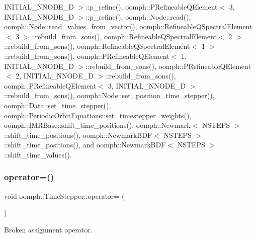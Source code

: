 I\+N\+I\+T\+I\+A\+L\+\_\+\+N\+N\+O\+D\+E\+\_\+D $>$\+::p\+\_\+refine(), oomph\+::\+P\+Refineable\+Q\+Element$<$ 3, I\+N\+I\+T\+I\+A\+L\+\_\+\+N\+N\+O\+D\+E\+\_\+D $>$\+::p\+\_\+refine(), oomph\+::\+Node\+::read(), oomph\+::\+Node\+::read\+\_\+values\+\_\+from\+\_\+vector(), oomph\+::\+Refineable\+Q\+Spectral\+Element$<$ 3 $>$\+::rebuild\+\_\+from\+\_\+sons(), oomph\+::\+Refineable\+Q\+Spectral\+Element$<$ 2 $>$\+::rebuild\+\_\+from\+\_\+sons(), oomph\+::\+Refineable\+Q\+Spectral\+Element$<$ 1 $>$\+::rebuild\+\_\+from\+\_\+sons(), oomph\+::\+P\+Refineable\+Q\+Element$<$ 1, I\+N\+I\+T\+I\+A\+L\+\_\+\+N\+N\+O\+D\+E\+\_\+D $>$\+::rebuild\+\_\+from\+\_\+sons(), oomph\+::\+P\+Refineable\+Q\+Element$<$ 2, I\+N\+I\+T\+I\+A\+L\+\_\+\+N\+N\+O\+D\+E\+\_\+D $>$\+::rebuild\+\_\+from\+\_\+sons(), oomph\+::\+P\+Refineable\+Q\+Element$<$ 3, I\+N\+I\+T\+I\+A\+L\+\_\+\+N\+N\+O\+D\+E\+\_\+D $>$\+::rebuild\+\_\+from\+\_\+sons(), oomph\+::\+Node\+::set\+\_\+position\+\_\+time\+\_\+stepper(), oomph\+::\+Data\+::set\+\_\+time\+\_\+stepper(), oomph\+::\+Periodic\+Orbit\+Equations\+::set\+\_\+timestepper\+\_\+weights(), oomph\+::\+I\+M\+R\+Base\+::shift\+\_\+time\+\_\+positions(), oomph\+::\+Newmark$<$ N\+S\+T\+E\+P\+S $>$\+::shift\+\_\+time\+\_\+positions(), oomph\+::\+Newmark\+B\+D\+F$<$ N\+S\+T\+E\+P\+S $>$\+::shift\+\_\+time\+\_\+positions(), and oomph\+::\+Newmark\+B\+D\+F$<$ N\+S\+T\+E\+P\+S $>$\+::shift\+\_\+time\+\_\+values().

\mbox{\label{classoomph_1_1TimeStepper_af85cc67365648d1bf5270311d460e0ec}} 
\subsubsection{\texorpdfstring{operator=()}{operator=()}}
{\footnotesize\ttfamily void oomph\+::\+Time\+Stepper\+::operator= (\begin{DoxyParamCaption}\item[{const \hyperlink{classoomph_1_1TimeStepper}{Time\+Stepper} \&}]{ }\end{DoxyParamCaption})\hspace{0.3cm}{\ttfamily [inline]}}



Broken assignment operator. 



